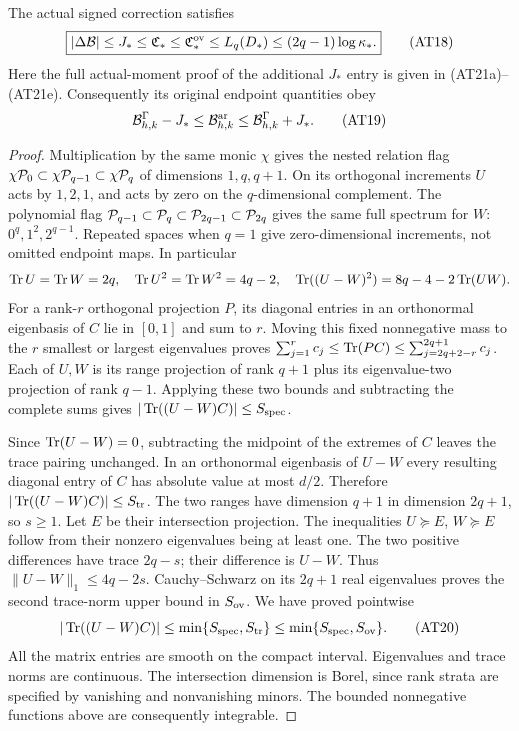\begin{theorem}
The actual signed correction satisfies
\[
\boxed{|\Delta\mathcal B|\le J_*\le\mathfrak C_*
 \le\mathfrak C_*^{\rm ov}\le L_q(D_*)
 \le(2q-1)\log\kappa_* .}\tag{AT18}
\]
Here the full actual-moment proof of the additional $J_*$ entry is
given in (AT21a)--(AT21e). Consequently its original endpoint quantities obey
\[
\mathcal B^\Gamma_{h,k}-J_*
 \le\mathcal B^{\mathrm{ar}}_{h,k}
 \le\mathcal B^\Gamma_{h,k}+J_* .\tag{AT19}
\]
\end{theorem}
\begin{proof}
Multiplication by the same monic $\chi$ gives the nested relation
flag $\chi\mathcal P_0\subset\chi\mathcal P_{q-1}\subset\chi\mathcal P_q$ of
dimensions $1,q,q+1$. On its orthogonal increments $U$ acts by
$1,2,1$, and acts by zero on the $q$-dimensional complement.
The polynomial flag $\mathcal P_{q-1}\subset\mathcal P_q\subset\mathcal P_{2q-1}
\subset\mathcal P_{2q}$ gives the same full spectrum for $W$:
$0^q,1^2,2^{q-1}$. Repeated spaces when $q=1$ give zero-dimensional
increments, not omitted endpoint maps. In particular
\[
\operatorname{Tr} U=\operatorname{Tr} W=2q,\quad \operatorname{Tr} U^2=\operatorname{Tr} W^2=4q-2,
\quad\operatorname{Tr}((U-W)^2)=8q-4-2\operatorname{Tr}(UW).
\]
For a rank-$r$ orthogonal projection $P$, its diagonal entries in
an orthonormal eigenbasis of $C$ lie in $[0,1]$ and sum to $r$.
Moving this fixed nonnegative mass to the $r$ smallest or largest
eigenvalues proves
$\sum_{j=1}^r c_j\le\operatorname{Tr}(PC)\le\sum_{j=2q+2-r}^{2q+1}c_j$.
Each of $U,W$ is its range projection of rank $q+1$ plus its
eigenvalue-two projection of rank $q-1$. Applying these two bounds
and subtracting the complete sums gives $|\operatorname{Tr}((U-W)C)|\le S_{\rm spec}$.

Since $\operatorname{Tr}(U-W)=0$, subtracting the midpoint of the extremes of
$C$ leaves the trace pairing unchanged. In an orthonormal eigenbasis
of $U-W$ every resulting diagonal entry of $C$ has absolute value
at most $d/2$. Therefore $|\operatorname{Tr}((U-W)C)|\le S_{\rm tr}$.
The two ranges have dimension $q+1$ in dimension $2q+1$, so $s\ge1$.
Let $E$ be their intersection projection. The inequalities
$U\succeq E$, $W\succeq E$ follow from their nonzero eigenvalues
being at least one. The two positive differences have trace $2q-s$;
their difference is $U-W$. Thus $\|U-W\|_1\le4q-2s$.
Cauchy--Schwarz on its $2q+1$ real eigenvalues proves the second
trace-norm upper bound in $S_{\rm ov}$. We have proved pointwise
\[
|\operatorname{Tr}((U-W)C)|\le\min\{S_{\rm spec},S_{\rm tr}\}
 \le\min\{S_{\rm spec},S_{\rm ov}\}.\tag{AT20}
\]
All the matrix entries are smooth on the compact interval. Eigenvalues
and trace norms are continuous. The intersection dimension is Borel,
since rank strata are specified by vanishing and nonvanishing minors.
The bounded nonnegative functions above are consequently integrable.


\end{proof}
